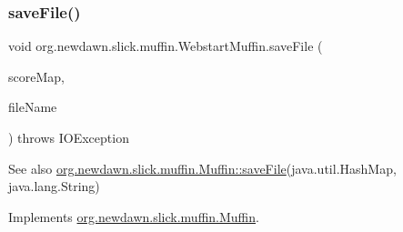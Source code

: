\subsubsection{\texorpdfstring{save\+File()}{saveFile()}}
{\footnotesize\ttfamily void org.\+newdawn.\+slick.\+muffin.\+Webstart\+Muffin.\+save\+File (\begin{DoxyParamCaption}\item[{Hash\+Map}]{score\+Map,  }\item[{String}]{file\+Name }\end{DoxyParamCaption}) throws I\+O\+Exception\hspace{0.3cm}{\ttfamily [inline]}}

\begin{DoxySeeAlso}{See also}
\mbox{\hyperlink{interfaceorg_1_1newdawn_1_1slick_1_1muffin_1_1_muffin_a025189130fb123bc751e58677435974a}{org.\+newdawn.\+slick.\+muffin.\+Muffin\+::save\+File}}(java.\+util.\+Hash\+Map, java.\+lang.\+String) 
\end{DoxySeeAlso}


Implements \mbox{\hyperlink{interfaceorg_1_1newdawn_1_1slick_1_1muffin_1_1_muffin_a025189130fb123bc751e58677435974a}{org.\+newdawn.\+slick.\+muffin.\+Muffin}}.


